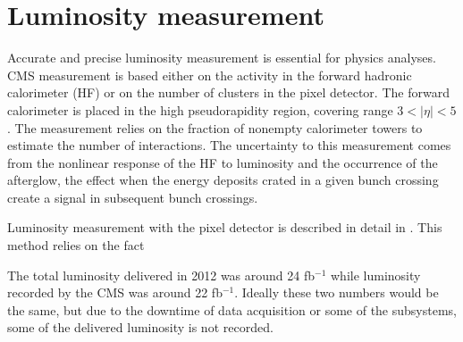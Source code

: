 \section{Luminosity measurement}
\label{sec:lumi}

Accurate and precise luminosity measurement is essential for physics analyses. CMS measurement is based either on the activity in the forward hadronic calorimeter (HF) or on the number of clusters in the pixel detector.
The forward calorimeter is placed in the high pseudorapidity region, covering range $3<|\eta|<5$. The measurement relies on the fraction of nonempty calorimeter towers to estimate the number of interactions. The uncertainty to this measurement comes from the nonlinear response of the HF to luminosity and the occurrence of the afterglow, the effect when the energy deposits crated in a given bunch crossing create a signal in subsequent bunch crossings. 
\par Luminosity measurement with the pixel detector is described in detail in \cite{CMS:2013gfa}. This method relies on the fact    

The total luminosity delivered in 2012 was around 24 fb$^{-1}$ while luminosity recorded by the CMS was around 22 fb$^{-1}$. Ideally these two numbers would be the same, but due to the downtime of data acquisition or some of the subsystems, some of the delivered luminosity is not recorded. 